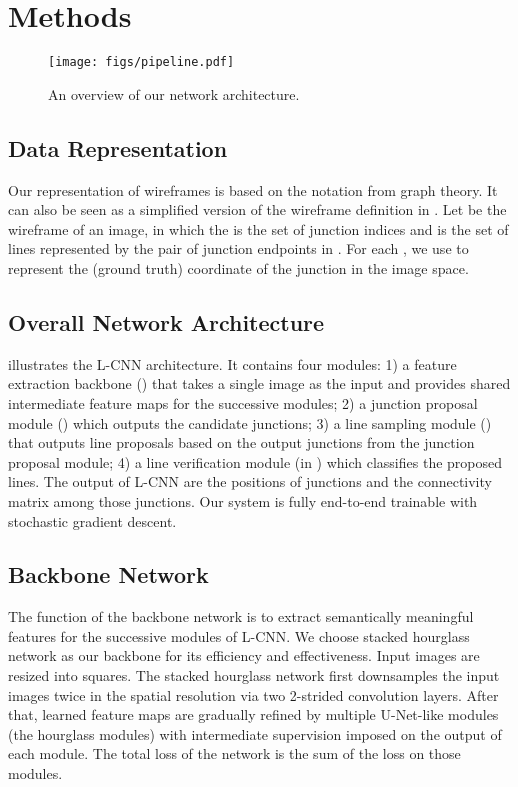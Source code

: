 \documentclass[10pt,twocolumn,letterpaper]{article}
\newcommand{\requireJunctype}[1]{}
\begin{document}
\section{Methods} \label{sec:method}

\begin{figure}[t]
    \centering
    \texttt{[image: figs/pipeline.pdf]}
    \caption{An overview of our network architecture.}
    \label{fig:pipeline}
\end{figure}


\subsection{Data Representation} 
\label{sec:representation}
Our representation of wireframes is based on the notation from graph theory. It can also be seen as a simplified version of the wireframe definition in \cite{Huang:2018:LPW}. Let  be the wireframe of an image, in which the  is the set of junction indices and  is the set of lines represented by the pair of junction endpoints in .  For each , we use  to represent the (ground truth) coordinate of the junction  in the image space\requireJunctype{and  be the type of that junction (if it is labeled in the dataset)}.

\subsection{Overall Network Architecture}
\label{sec:overallarch}

 illustrates the L-CNN architecture. It contains four modules: 1) a feature extraction backbone () that takes a single image as the input and provides shared intermediate feature maps for the successive modules; 2) a junction proposal module () which outputs the candidate junctions; 3) a line sampling module () that outputs line proposals based on the output junctions from the junction proposal module; 4) a line verification module (in ) which classifies the proposed lines. The output of L-CNN are the positions of junctions and the connectivity matrix among those junctions. Our system is fully end-to-end trainable with stochastic gradient descent. 


\subsection{Backbone Network} \label{sec:backbone}
The function of the backbone network is to extract semantically meaningful features for the successive modules of L-CNN. We choose stacked hourglass network \cite{Newell:2016:Stacked} 
as our backbone for its efficiency and effectiveness. Input images are resized into squares. The stacked hourglass network first downsamples the input images twice in the spatial resolution via two 2-strided convolution layers. After that, learned feature maps are gradually refined by multiple U-Net-like modules \cite{ronneberger2015u} (the hourglass modules) with intermediate supervision imposed on the output of each module. The total loss of the network is the sum of the loss on those modules.
\end{document}
